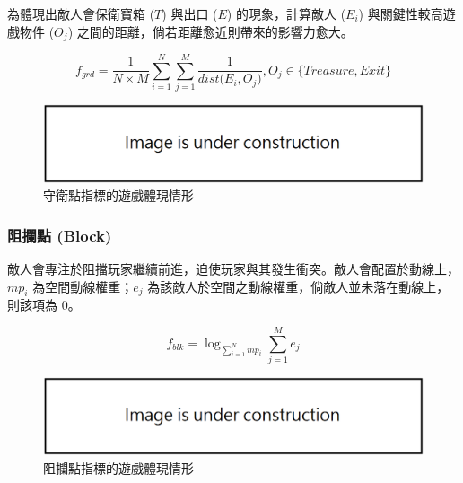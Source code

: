 為體現出敵人會保衛寶箱 ($T$) 與出口 ($E$) 的現象，計算敵人 ($E_{i}$) 與關鍵性較高遊戲物件 ($O_{j}$) 之間的距離，倘若距離愈近則帶來的影響力愈大。

\begin{equation}
    f_{grd}=\frac{1}{N \times M} \sum_{i=1}^{N} \sum_{j=1}^{M} \frac{1}{dist\big(E_{i}, O_{j}\big)}, O_{j} \in \{ Treasure, Exit \}
\end{equation}

\begin{figure}[ht]
  \begin{center}
    \includegraphics[width=1.0\textwidth]{figures/under_construction.png}
    \caption{守衛點指標的遊戲體現情形}
    \label{fig:fitnesses-guard-gameplay}
  \end{center}
\end{figure}

\subsubsection{阻攔點 (Block)}
\label{sssec:method-segments-fitnesses-block}

敵人會專注於阻擋玩家繼續前進，迫使玩家與其發生衝突。敵人會配置於動線上，$mp_{i}$ 為空間動線權重；$e_j$ 為該敵人於空間之動線權重，倘敵人並未落在動線上，則該項為 0。

\begin{equation}
    f_{blk}=\log _{\sum_{i=1}^{N} mp_{i}} \sum_{j=1}^{M} e_{j}
\end{equation}

\begin{figure}[ht]
  \begin{center}
    \includegraphics[width=1.0\textwidth]{figures/under_construction.png}
    \caption{阻攔點指標的遊戲體現情形}
    \label{fig:fitnesses-block-gameplay}
  \end{center}
\end{figure}

